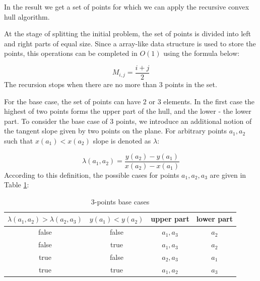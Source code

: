\documentclass[a4paper,english,numberwithinsect,notab]{eurocg20-submission}
\begin{document}
	In the result we get a set of points for which we can apply the recursive convex hull algorithm.
	
	
	
	At the stage of splitting the initial problem, the set of points is divided into left and right parts of equal size. Since a array-like data structure is used to store the points, this operations can be completed in $O(1)$ using the formula below:
	
	\begin{equation}
		M_{i,j}=\frac{i+j}{2}
	\end{equation}
	The recursion stops when there are no more than $3$ points in the set.
	
	For the base case, the set of points can have $2$ or $3$ elements. In the first case the highest of two points forms the upper part of the hull, and the lower - the lower part. To consider the base case of $3$ points, we introduce an additional notion of the tangent slope given by two points on the plane. For arbitrary points $a_1, a_2$ such that $x(a_1)<x(a_2)$ slope is denoted as $\lambda$:
	
	\begin{equation}
	\lambda(a_1, a_2)=\frac{y(a_2)-y(a_1)}{x(a_2)-x(a_1)}
	\end{equation}
	According to this definition, the possible cases for points $a_1,a_2,a_3$ are given in Table \ref{table:3points}:
	
	\begin{table}[htbp]
	\caption{3-points base cases}
	\label{table:3points}
	\begin{center}
		\begin{tabular}{|c|c|c|c|}
			\hline
			\textbf{$\lambda(a_1, a_2) > \lambda(a_2, a_3)$} & \textbf{$y(a_1) < y(a_2)$} & upper part & lower part\\
			\hline
			false & false & $a_1, a_3$ & $a_2$ \\
			\hline
			false & true & $a_1, a_3$ & $a_2$ \\
			\hline
			true & false & $a_2, a_3$ & $a_1$ \\
			\hline
			true & true & $a_1, a_2$ & $a_3$ \\
			\hline
		\end{tabular} 
	\end{center}
	\end{table} 
\end{document}
